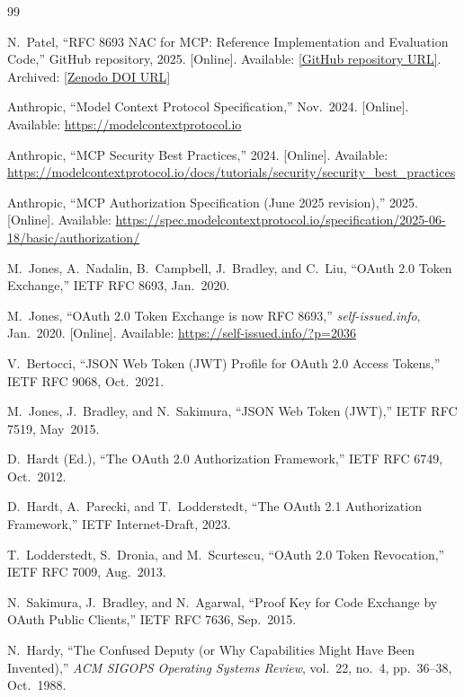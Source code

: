 \documentclass[journal]{IEEEtran}
\begin{document}
\begin{thebibliography}{99}

N.~Patel,
``RFC 8693 NAC for MCP: Reference Implementation and Evaluation Code,''
GitHub repository, 2025.
[Online]. Available: \url{[GitHub repository URL]}.
Archived: \url{[Zenodo DOI URL]}

Anthropic, ``Model Context Protocol Specification,'' Nov.\ 2024.
[Online]. Available: \url{https://modelcontextprotocol.io}

Anthropic, ``MCP Security Best Practices,'' 2024.
[Online]. Available:
\url{https://modelcontextprotocol.io/docs/tutorials/security/security_best_practices}

Anthropic, ``MCP Authorization Specification (June 2025 revision),'' 2025.
[Online]. Available:
\url{https://spec.modelcontextprotocol.io/specification/2025-06-18/basic/authorization/}

M.\ Jones, A.\ Nadalin, B.\ Campbell, J.\ Bradley, and C.\ Liu,
``OAuth 2.0 Token Exchange,'' IETF RFC 8693, Jan.\ 2020.

M.\ Jones, ``OAuth 2.0 Token Exchange is now RFC 8693,''
\textit{self-issued.info}, Jan.\ 2020.
[Online]. Available: \url{https://self-issued.info/?p=2036}

V.\ Bertocci,
``JSON Web Token (JWT) Profile for OAuth 2.0 Access Tokens,''
IETF RFC 9068, Oct.\ 2021.

M.\ Jones, J.\ Bradley, and N.\ Sakimura,
``JSON Web Token (JWT),'' IETF RFC 7519, May\ 2015.

D.\ Hardt (Ed.),
``The OAuth 2.0 Authorization Framework,'' IETF RFC 6749, Oct.\ 2012.

D.\ Hardt, A.\ Parecki, and T.\ Lodderstedt,
``The OAuth 2.1 Authorization Framework,''
IETF Internet-Draft, 2023.

T.\ Lodderstedt, S.\ Dronia, and M.\ Scurtescu,
``OAuth 2.0 Token Revocation,'' IETF RFC 7009, Aug.\ 2013.

N.\ Sakimura, J.\ Bradley, and N.\ Agarwal,
``Proof Key for Code Exchange by OAuth Public Clients,''
IETF RFC 7636, Sep.\ 2015.

N.\ Hardy,
``The Confused Deputy (or Why Capabilities Might Have Been Invented),''
\textit{ACM SIGOPS Operating Systems Review},
vol.\ 22, no.\ 4, pp.\ 36--38, Oct.\ 1988.


\end{thebibliography}
\end{document}
